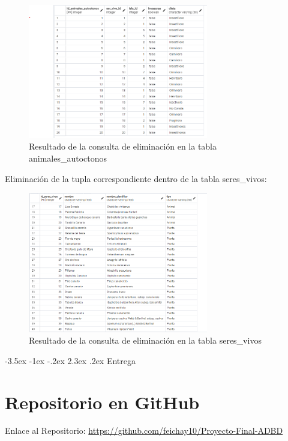 \documentclass[11pt]{report}
\makeatletter
\renewcommand\chapter{\@startsection{chapter}{0}{\z@}%
    {-3.5ex \@plus -1ex \@minus -.2ex}%
    {2.3ex \@plus.2ex}%
    {\normalfont\Large\bfseries}}
\makeatother
\begin{document}
\begin{figure}[H]
      \centering
      \includegraphics[width=0.7\textwidth]{src/img/tabla_animales_autoctonos_despues_delete.png}
      \caption{Resultado de la consulta de eliminación en la tabla animales\_autoctonos}
      \label{fig:delete_animales_autoctonos}
\end{figure}

Eliminación de la tupla correspondiente dentro de la tabla seres\_vivos:

\begin{figure}[H]
      \centering
      \includegraphics[width=0.7\textwidth]{src/img/tabla_seres_vivos_despues_delete.png}
      \caption{Resultado de la consulta de eliminación en la tabla seres\_vivos}
      \label{fig:delete_seres_vivos}
\end{figure}

\chapter{Entrega}

\section{Repositorio en GitHub}
Enlace al Repositorio: \url{https://github.com/feichay10/Proyecto-Final-ADBD}
\end{document}
